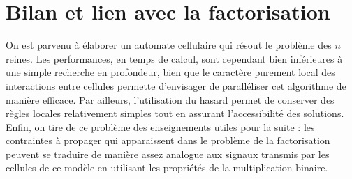 



\section{Bilan et lien avec la factorisation}



On est parvenu à élaborer un automate cellulaire qui résout le problème des $n$ reines. Les performances, en temps de calcul, sont cependant  bien inférieures à une simple recherche en profondeur, bien que le caractère purement local des interactions entre cellules permette d'envisager de paralléliser cet algorithme de manière efficace. Par ailleurs, l'utilisation du hasard permet de conserver des règles locales relativement simples tout en assurant l'accessibilité des solutions. Enfin, on tire de ce problème des enseignements utiles pour la suite : les con\-train\-tes à propager qui apparaissent dans le problème de la factorisation  peuvent se traduire de manière assez analogue aux signaux transmis par les cellules de ce modèle en utilisant les propriétés de la multiplication binaire.

